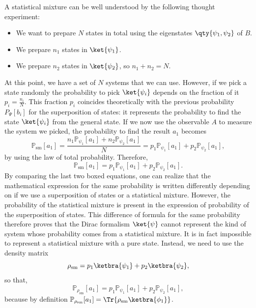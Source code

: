 A statistical mixture can be well understood by the following thought experiment:
\begin{itemize}
    \item We want to prepare $N$ states in total using the eigenstates $\qty{\psi_1,\psi_2}$ of $B$.
    \item We prepare $n_1$ states in $\ket{\psi_1}$.
    \item We prepare $n_2$ states in $\ket{\psi_2}$, so $n_1+n_2=N$.
\end{itemize}
At this point, we have a set of $N$ systems that we can use. However, if we pick a state randomly the probability to pick $\ket{\psi_i}$ depends on the fraction of it $p_i=\frac{n_i}{N}$. This fraction $p_i$ coincides theoretically with the previous probability $P_\Psi[b_i]$ for the superposition of states: it represents the probability to find the state $\ket{\psi_i}$ from the general state. If we now use the observable $A$ to measure the system we picked, the probability to find the result $a_1$ becomes
\begin{equation*}
    \mathbb{P}_\mathrm{sm}[a_1] = \frac{n_1\mathbb{P}_{\psi_1}[a_1]+n_2\mathbb{P}_{\psi_2}[a_1]}{N} = p_1\mathbb{P}_{\psi_1}[a_1]+p_2\mathbb{P}_{\psi_2}[a_1],
\end{equation*}
by using the law of total probability. Therefore,
\begin{equation}
    \boxed{\mathbb{P}_\mathrm{sm}[a_1] =p_1\mathbb{P}_{\psi_1}[a_1]+p_2\mathbb{P}_{\psi_2}[a_1]}.
\end{equation}
By comparing the last two boxed equations, one can realize that the mathematical expression for the same probability is written differently depending on if we use a superposition of states or a statistical mixture. However, the probability of the statistical mixture is present in the expression of probability of the superposition of states. This difference of formula for the same probability therefore proves that the Dirac formalism $\ket{\psi}$ cannot represent the kind of system whose probability comes from a statistical mixture. It is in fact impossible to represent a statistical mixture with a pure state. Instead, we need to use the density matrix 
\begin{equation}
    \rho_\mathrm{sm} = p_1\ketbra{\psi_1}+p_2\ketbra{\psi_2},
\end{equation} 
so that,
\begin{equation}
    \mathbb{P}_{\rho_\mathrm{sm}}[a_1] = p_1\mathbb{P}_{\psi_1}[a_1]+p_2\mathbb{P}_{\psi_2}[a_1],
\end{equation}
because by definition $\mathbb{P}_{\rho_\mathrm{sm}}[a_1]=\Tr{\rho_\mathrm{sm}\ketbra{\phi_1}}$.
